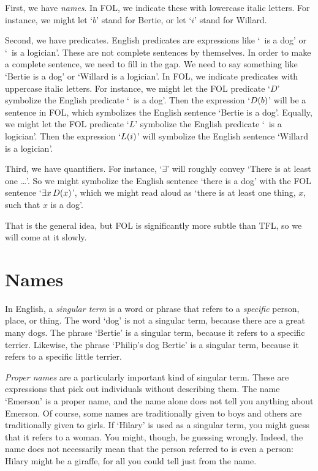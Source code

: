 First, we have \emph{names}. In FOL, we indicate these with lowercase italic letters. For instance, we might let `$b$' stand for Bertie, or let `$i$' stand for Willard.

Second, we have predicates. English predicates are expressions like `\blank\ is a dog' or `\blank\ is a logician'. These are not complete sentences by themselves. In order to make a complete sentence, we need to fill in the gap. We need to say something like `Bertie is a dog' or `Willard is a logician'. In FOL, we indicate predicates with uppercase italic letters. For instance, we might let the FOL predicate `$D$' symbolize the English predicate `\blank\ is a dog'. Then the expression `$D(b)$' will be a sentence in FOL, which symbolizes the English sentence `Bertie is a dog'. Equally, we might let the FOL predicate `$L$' symbolize the English predicate `\blank\ is a logician'. Then the expression `$L(i)$' will symbolize the English sentence `Willard is a logician'.

Third, we have quantifiers. For instance, `$\exists$' will roughly convey `There is at least one \ldots'. So we might symbolize the English sentence `there is a dog' with the FOL sentence `$\exists x\, D(x)$', which we might read aloud as `there is at least one thing, $x$, such that $x$ is a dog'.

That is the general idea, but FOL is significantly more subtle than TFL, so we will come at it slowly.


\section{Names}
In English, a \emph{singular term} is a word or phrase that refers to a \emph{specific} person, place, or thing. The word `dog' is not a singular term, because there are a great many dogs. The phrase `Bertie' is a singular term, because it refers to a specific terrier. Likewise, the phrase `Philip's dog Bertie' is a singular term, because it refers to a specific little terrier.

\emph{Proper names} are a particularly important kind of singular term. These are expressions that pick out individuals without describing them. The name `Emerson' is a proper name, and the name alone does not tell you anything about Emerson. Of course, some names are traditionally given to boys and others are traditionally given to girls. If `Hilary' is used as a singular term, you might guess that it refers to a woman. You might, though, be guessing wrongly. Indeed, the name does not necessarily mean that the person referred to is even a person: Hilary might be a giraffe, for all you could tell just from the name.

